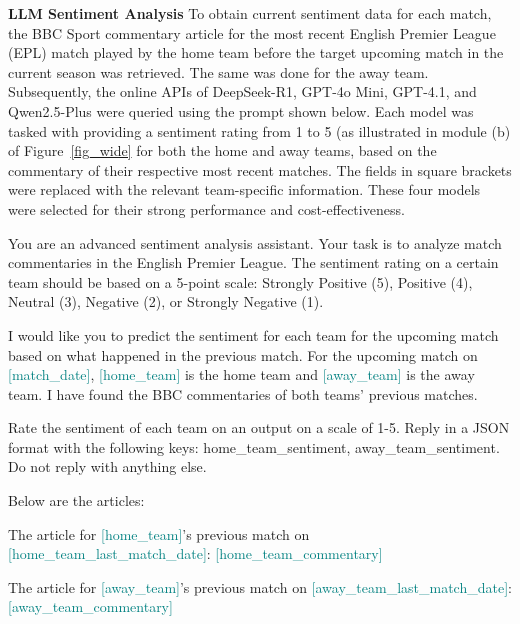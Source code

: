 \documentclass[conference]{IEEEtran}
\newenvironment{promptsection}{
  \par\smallskip
  \noindent
  \ttfamily\small
  \setlength{\parindent}{0pt}
  \setlength{\parskip}{0.5em}
}{
  \par\smallskip
  \rmfamily\normalsize
}
\begin{document}
\noindent\textbf{LLM Sentiment Analysis
}
To obtain current sentiment data for each match, the BBC Sport commentary article for the most recent English Premier League (EPL) match played by the home team before the target upcoming match in the current season was retrieved. The same was done for the away team. Subsequently, the online APIs of DeepSeek-R1, GPT-4o Mini, GPT-4.1, and Qwen2.5-Plus were queried using the prompt shown below. Each model was tasked with providing a sentiment rating from 1 to 5 (as illustrated in module (b) of Figure~\ref{fig_wide} for both the home and away teams, based on the commentary of their respective most recent matches. The fields in square brackets were replaced with the relevant team-specific information. These four models were selected for their strong performance and cost-effectiveness.



\begin{promptsection}
\footnotesize
You are an advanced sentiment analysis assistant. Your task is to 
analyze match commentaries in the English Premier League. The sentiment 
rating on a certain team should be based on a 5-point scale:
Strongly Positive (5), Positive (4), Neutral (3), Negative (2), or 
Strongly Negative (1).

I would like you to predict the sentiment for each team for the 
upcoming match based on what happened in the previous match. For the 
upcoming match on \textcolor{teal}{[match\_date]}, \textcolor{teal}{[home\_team]} is the
home team and \textcolor{teal}{[away\_team]} is the away team. I have found the BBC 
commentaries of both teams' previous matches.

Rate the sentiment of each team on an output on a scale of 1-5. Reply 
in a JSON format with the following keys: home\_team\_sentiment, 
away\_team\_sentiment. Do not reply with anything else.

Below are the articles:

The article for \textcolor{teal}{[home\_team]}'s previous match on 
\textcolor{teal}{[home\_team\_last\_match\_date]}:
\textcolor{teal}{[home\_team\_commentary]}

The article for \textcolor{teal}{[away\_team]}'s previous match on 
\textcolor{teal}{[away\_team\_last\_match\_date]}:
\textcolor{teal}{[away\_team\_commentary]}
\end{promptsection}
\end{document}

